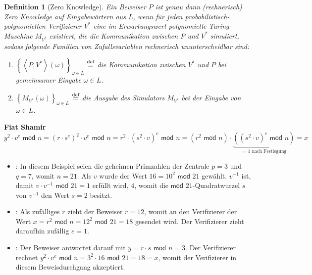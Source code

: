 \documentclass[12pt,a4paper,bibliography=totocnumbered,listof=totocnumbered]{scrartcl}
\newtheorem{definition}{Definition}
\begin{document}
\begin{definition}[Zero Knowledge]
\label{definition:zeroknowledge}
Ein Beweiser \( P \) ist genau dann (rechnerisch) \textnormal{Zero Knowledge} auf Eingabewörtern aus \( L \), wenn für jeden probabilistisch-polynomiellen Verifizierer \( V ^ {\ast} \) eine im Erwartungswert polynomielle Turing-Maschine \( M_{V^{\ast}} \) existiert, die die Kommunikation zwischen \( P \) und \( V^{\ast} \) simuliert, sodass folgende Familien von Zufallsvariablen rechnerisch ununterscheidbar sind:
\begin{enumerate}
\item[1.] \( \left\lbrace \left< P, V^{\ast} \right> \left( \omega \right) \right\rbrace _{\omega \in L} \) \( \overset{\textnormal{def}}{=} \) die Kommunikation zwischen \( V ^ {\ast}\) und \( P \) bei gemeinsamer Eingabe \( \omega \in L \).
\item[2.] \( \left\lbrace M_{V^{\ast}} \left( \omega \right) \right\rbrace _{\omega \in L} \) \( \overset{\textnormal{def}}{=} \) die Ausgabe des Simulators \( M_{V^{\ast}} \) bei der Eingabe von \( \omega \in L \). 
\end{enumerate}
\end{definition}

\textbf{Fiat Shamir} \( y^2 \cdot v^e \textsf{ mod } n =
\left( r \cdot s^e \right)^2 \cdot v^e \textsf{ mod } n =
r^2 \cdot \left( s^2 \cdot v \right)^e \textsf{ mod } n = 
\left( r^2 \textsf{ mod } n \right) \cdot \underbrace{ \left( \left( s^2 \cdot v \right)^e \textsf{ mod } n \right) }_{ = 1 \text{ nach Festlegung}} = x \)

\begin{itemize}
\item[Ausstellung durch Zentrale]: In diesem Beispiel seien die geheimen Primzahlen der Zentrale \( p = 3 \) und \( q = 7 \), womit \( n = 21 \). Als \( v \) wurde der Wert \( 16 = 10^2 \textsf{ mod } 21\) gewählt. \( v^{-1} \) ist, damit \( v \cdot v^{-1} \textsf{ mod } 21 = 1 \) erfüllt wird, \( 4 \), womit die \( \textsf{mod } 21 \)-Quadratwurzel \( s \) von \( v^{-1} \) den Wert \( s = 2 \) besitzt.
\item[(Schritt 1)]: Als zufälliges \( r \) zieht der Beweiser \( r = 12 \), womit an den Verifizierer der Wert \( x = r^2 \textsf{ mod } n = 12 ^ 2 \textsf{ mod } 21 = 18 \) gesendet wird. Der Verifizierer zieht daraufhin zufällig \( e = 1 \).
\item[(Schritt 2)]: Der Beweiser antwortet darauf mit \( y = r \cdot s \textsf{ mod } n = 3 \). Der Verifizierer rechnet \( y^2 \cdot v^e \textsf{ mod } n = 3^2 \cdot 16 \textsf{ mod } 21 = 18 = x \), womit der Verifizierer in diesem Beweisdurchgang akzeptiert.
\end{itemize}
\end{document}
